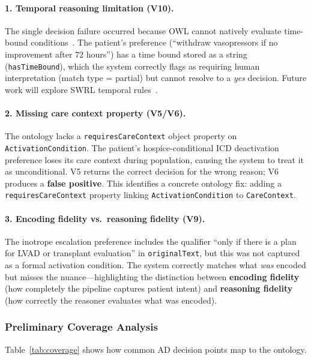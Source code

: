 \documentclass[11pt]{article}
\newcommand{\onto}[1]{\texttt{#1}}
\begin{document}
\paragraph{1. Temporal reasoning limitation (V10).}
The single decision failure occurred because OWL cannot natively evaluate time-bound conditions~\cite{owl2primer}. The patient's preference (``withdraw vasopressors if no improvement after 72 hours'') has a time bound stored as a string (\onto{hasTimeBound}), which the system correctly flags as requiring human interpretation (match type = partial) but cannot resolve to a \textit{yes} decision. Future work will explore SWRL temporal rules~\cite{swrl}.

\paragraph{2. Missing care context property (V5/V6).}
The ontology lacks a \onto{requiresCareContext} object property on \onto{ActivationCondition}. The patient's hospice-conditional ICD deactivation preference loses its care context during population, causing the system to treat it as unconditional. V5 returns the correct decision for the wrong reason; V6 produces a \textbf{false positive}. This identifies a concrete ontology fix: adding a \onto{requiresCareContext} property linking \onto{ActivationCondition} to \onto{CareContext}.

\paragraph{3. Encoding fidelity vs.\ reasoning fidelity (V9).}
The inotrope escalation preference includes the qualifier ``only if there is a plan for LVAD or transplant evaluation'' in \onto{originalText}, but this was not captured as a formal activation condition. The system correctly matches what \textit{was} encoded but misses the nuance---highlighting the distinction between \textbf{encoding fidelity} (how completely the pipeline captures patient intent) and \textbf{reasoning fidelity} (how correctly the reasoner evaluates what was encoded).

\subsubsection{Preliminary Coverage Analysis}

Table~\ref{tab:coverage} shows how common AD decision points map to the ontology.
\end{document}
